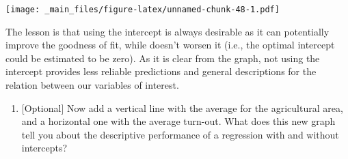 \documentclass[
]{book}
\providecommand{\tightlist}{%
  \setlength{\itemsep}{0pt}\setlength{\parskip}{0pt}}
\begin{document}
\texttt{[image: \_main\_files/figure-latex/unnamed-chunk-48-1.pdf]}

The lesson is that using the intercept is always desirable as it can potentially improve the goodness of fit, while doesn't worsen it (i.e., the optimal intercept could be estimated to be zero). As it is clear from the graph, not using the intercept provides less reliable predictions and general descriptions for the relation between our variables of interest.

\begin{enumerate}
\def\labelenumi{\roman{enumi}.}
\setcounter{enumi}{10}
\tightlist
\item
  {[}Optional{]} Now add a vertical line with the average for the agricultural area, and a horizontal one with the average turn-out. What does this new graph tell you about the descriptive performance of a regression with and without intercepts?
\end{enumerate}
\end{document}
